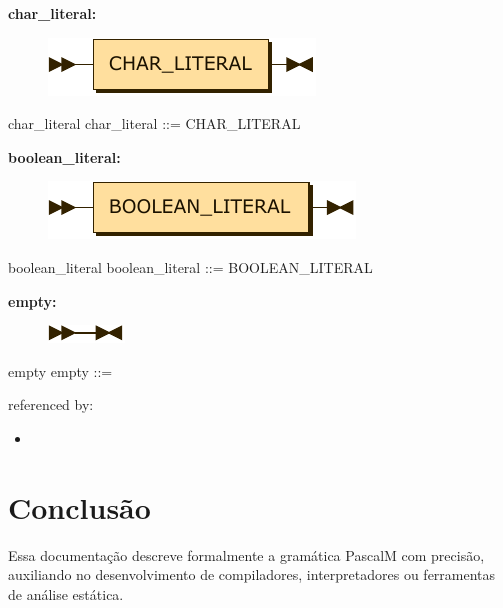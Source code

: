 \documentclass[10pt,a4paper,twoside]{article}
\providecommand{\tightlist}{%
  \setlength{\itemsep}{0pt}\setlength{\parskip}{0pt}}
\newcounter{grammarbox}[section]
\begin{document}
\textbf{char\_literal:}

\begin{figure}[H]
\centering
\includegraphics{diagram/char_literal.pdf}

\end{figure}

\begin{grammarbox}{char\_literal}
\vspace{0.5em}
char\_literal
         ::= CHAR\_LITERAL
\end{grammarbox}

\textbf{boolean\_literal:}

\begin{figure}[H]
\centering
\includegraphics{diagram/boolean_literal.pdf}

\end{figure}

\begin{grammarbox}{boolean\_literal}
\vspace{0.5em}
boolean\_literal
         ::= BOOLEAN\_LITERAL
\end{grammarbox}

\textbf{empty:}

\begin{figure}[H]
\centering
\includegraphics{diagram/empty.pdf}

\end{figure}

\begin{grammarbox}{empty}
\vspace{0.5em}
empty    ::=
\end{grammarbox}

referenced by:

\begin{itemize}
\tightlist
\item
\end{itemize}

\section{Conclusão}
Essa documentação descreve formalmente a gramática PascalM com precisão,
auxiliando no desenvolvimento de compiladores, interpretadores ou ferramentas
de análise estática.
\end{document}
